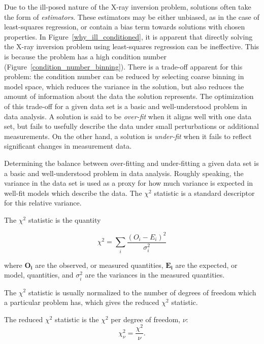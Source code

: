 Due to the ill-posed nature of the X-ray inversion problem, solutions often take the form of \textit{estimators}. These estimators may be either unbiased, as in the case of least-squares regression, or contain a bias term towards solutions with chosen properties. In Figure~\ref{why_ill_conditioned}, it is apparent that directly solving the X-ray inversion problem using least-squares regression can be ineffective. This is because the problem has a high condition number (Figure~\ref{condition_number_binning}). There is a trade-off apparent for this problem: the condition number can be reduced by selecting coarse binning in model space, which reduces the variance in the solution, but also reduces the amount of information about the data the solution represents. The optimization of this trade-off for a given data set is a basic and well-understood problem in data analysis. A solution is said to be \textit{over-fit} when it aligns well with one data set, but fails to usefully describe the data under small perturbations or additional measurements. On the other hand, a solution is \textit{under-fit} when it fails to reflect significant changes in measurement data. 

Determining the balance between over-fitting and under-fitting a given data set is a basic and well-understood problem in data analysis. Roughly speaking, the variance in the data set is used as a proxy for how much variance is expected in well-fit models which describe the data. The $\chi^2$ statistic is a standard descriptor for this relative variance.

\begin{definition}
The $\chi^2$ statistic is the quantity 

$$\chi^2 = \sum_i \frac{(O_i - E_i)^2}{\sigma_i^2}$$

where $\mathbf{O_i}$ are the observed, or measured quantities, $\mathbf{E_i}$ are the expected, or model, quantities, and $\sigma_i^2$ are the variances in the measured quantities. 
\end{definition}

The $\chi^2$ statistic is usually normalized to the number of degrees of freedom which a particular problem has, which gives the reduced $\chi^2$ statistic.

\begin{definition}

The reduced $\chi^2$ statistic is the $\chi^2$ per degree of freedom, $\nu$: $$\chi^{2}_\nu = \frac{\chi^2}{\nu}.$$

\end{definition}

